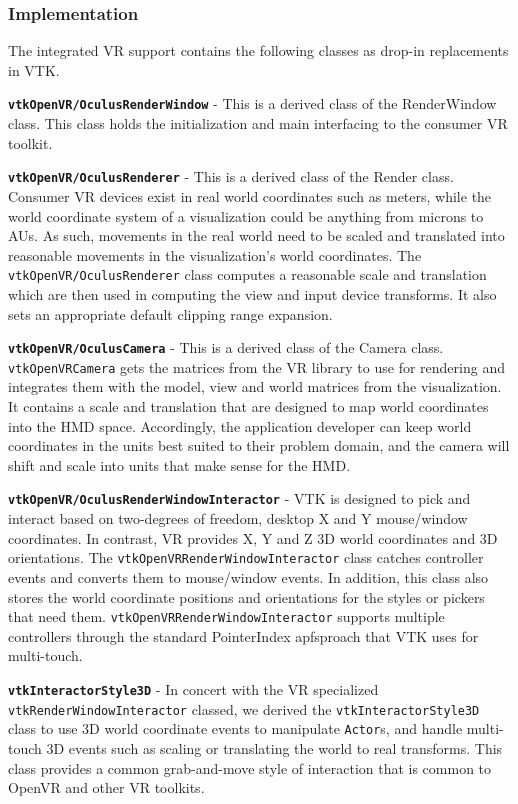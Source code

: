 \subsubsection{Implementation}

The integrated VR support contains the following classes as drop-in replacements in VTK.

\textbf{\texttt{vtkOpenVR/OculusRenderWindow}} - This is a derived class of the RenderWindow class.
This class holds the initialization and main interfacing to the consumer VR toolkit. 

\textbf{\texttt{vtkOpenVR/OculusRenderer}} - This is a derived class of the Render class.
Consumer VR devices exist in real world coordinates such as meters, while the world coordinate system of a visualization could be anything from microns to AUs. As such, movements in the real world need to be scaled and translated into reasonable movements in the visualization's world coordinates. The \texttt{vtkOpenVR/OculusRenderer} class computes a reasonable scale and translation which are then used in computing the view and input device transforms. 
It also sets an appropriate default clipping range expansion.

\textbf{\texttt{vtkOpenVR/OculusCamera}} - This is a derived class of the Camera class. \texttt{vtkOpenVRCamera} gets the matrices from the VR library to use for rendering and integrates them with the model, view and world matrices from the visualization. It contains a scale and translation that are designed to map world coordinates into the HMD space.
Accordingly, the application developer can keep world coordinates in the units best suited to their problem domain, and the camera will shift and scale into units that make sense for the HMD.

\textbf{\texttt{vtkOpenVR/OculusRenderWindowInteractor}} - VTK is designed to pick and interact based on two-degrees of freedom, desktop X and Y mouse/window coordinates.
In contrast, VR provides X, Y and Z 3D world coordinates and 3D orientations.
The \texttt{vtkOpenVRRenderWindowInteractor} class catches controller events and converts them to mouse/window events.
In addition, this class also stores the world coordinate positions and orientations for the styles or pickers that need them.
\texttt{vtkOpenVRRenderWindowInteractor} supports multiple controllers through the standard PointerIndex apfsproach that VTK uses for multi-touch.

\textbf{\texttt{vtkInteractorStyle3D}} - In concert with the VR specialized \texttt{vtkRenderWindowInteractor} classed, we derived the \texttt{vtkInteractorStyle3D} class
to use 3D world coordinate events to manipulate \texttt{Actor}s, and handle multi-touch 3D events such as scaling or translating the world to real transforms.
This class provides a common grab-and-move style of interaction that is common to OpenVR and other VR toolkits.

